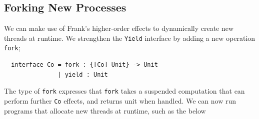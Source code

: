 \documentclass[msc,deptreport,cs]{infthesis} %
\newcommand{\code}[1]{\lstinline{#1}}
\newcommand{\todo}[1]
           {{\par\noindent\small\color{RoyalPurple}
  \framebox{\parbox{\dimexpr\linewidth-2\fboxsep-2\fboxrule}
    {\textbf{TODO:} #1}}}}
\begin{document}





\subsection{Forking New Processes}

We can make use of Frank's higher-order effects to dynamically create new
threads at runtime. We strengthen the \code{Yield} interface by adding a new
operation \code{fork};

\begin{lstlisting}
  interface Co = fork : {[Co] Unit} -> Unit
               | yield : Unit
\end{lstlisting}

The type of \code{fork} expresses that \code{fork} takes a suspended computation
that can perform further \code{Co} effects, and returns unit when handled. We
can now run programs that allocate new threads at runtime, such as the below
\end{document}
